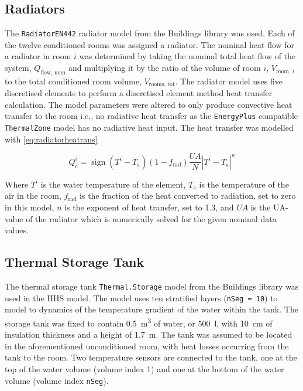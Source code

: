 \subsection{Radiators}
The \texttt{RadiatorEN442} radiator model from the Buildings library \cite{wetter_modelica_2014} was used. Each of the twelve conditioned rooms was assigned a radiator. The nominal heat flow for a radiator in room $i$ was determined by taking the nominal total heat flow of the system, $Q_\text{flow, nom}$ and multiplying it by the ratio of the volume of room $i$, $V_{\text{room, }i}$ to the total conditioned room volume, $V_\text{rooms, tot}$. The radiator model uses five discretised elements to perform a discretised element method heat transfer calculation. The model parameters were altered to only produce convective heat transfer to the room i.e., no radiative heat transfer as the \texttt{EnergyPlus} compatible \texttt{ThermalZone} model has no radiative heat input. The heat transfer was modelled with \cref{eq:radiatorheatrans} 


\begin{equation}
    Q_\text{c}^i=\operatorname{sign}(T^i-T_\text{a})(1-f_\text{rad})\frac{UA}{N}|T^i-T_\text{a}|^n\label{eq:radiatorheatrans}
\end{equation}

Where $T^i$ is the water temperature of the element, $T_\text{a}$ is the temperature of the air in the room, $f_\text{rad}$ is the fraction of the heat converted to radiation, set to zero in this model, $n$ is the exponent of heat transfer, set to 1.3, and $UA$ is the UA-value of the radiator which is numerically solved for the given nominal data values. 

\subsection{Thermal Storage Tank}
The thermal storage tank \texttt{Thermal.Storage} model from the Buildings library \cite{wetter_modelica_2014} was used in the \ac{HHS} model. The model uses ten stratified layers (\texttt{nSeg = 10}) to model to dynamics of the temperature gradient of the water within the tank. The storage tank was fixed to contain \qty{0.5}{\cubic\meter} of water, or \qty{500}{\litre}, with \qty{10}{\centi\meter} of insulation thickness and a height of \qty{1.7}{\meter}. The tank was assumed to be located in the aforementioned unconditioned room, with heat losses occurring from the tank to the room. Two temperature sensors are connected to the tank, one at the top of the water volume (volume index 1) and one at the bottom of the water volume (volume index \texttt{nSeg}). 

